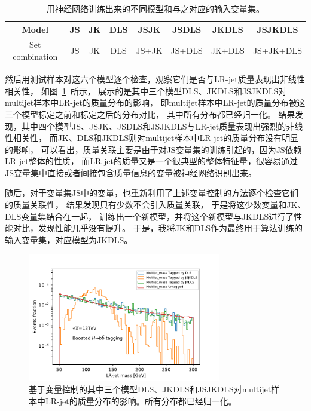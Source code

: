 \begin{table}[ht]
\caption{用神经网络训练出来的不同模型和与之对应的输入变量集。}
\begin{center}
\begin{adjustbox}{width=\columnwidth,center}
\begin{tabular}{c|c|c|c|c|c|c|c}
    \hline
    \hline
    Model & JS & JK & DLS & JSJK & JSDLS & JKDLS & JSJKDLS \\
    \hline  
    Set combination & JS & JK & DLS & JS+JK & JS+DLS & JK+DLS & JS+JK+DLS\\
    \hline
    \hline
\end{tabular}
\end{adjustbox}
\end{center}
\label{tab:MODELS}
\end{table}

然后用测试样本对这六个模型逐个检查，观察它们是否与LR-jet质量表现出非线性相关性，
如图~\ref{fig:XbbTagger1}~所示，
展示的是其中三个模型DLS、JKDLS和JSJKDLS对multijet样本中LR-jet的质量分布的影响，
即multijet样本中LR-jet的质量分布被这三个模型标定之前和标定之后的分布对比，
其中所有分布都已经归一化。
结果发现，其中四个模型JS、JSJK、JSDLS和JSJKDLS与LR-jet质量表现出强烈的非线性相关性，
而JK、DLS和JKDLS则对multijet样本中LR-jet的质量分布没有明显的影响，
可以看出，质量关联主要是由于对JS变量集的训练引起的，因为JS依赖LR-jet整体的性质，
而LR-jet的质量又是一个很典型的整体特征量，很容易通过JS变量集中直接或者间接包含质量信息的变量被神经网络识别出来。

随后，对于变量集JS中的变量，也重新利用了上述变量控制的方法逐个检查它们的质量关联性，
结果发现只有少数不会引入质量关联，
于是将这少数变量和JK、DLS变量集结合在一起，
训练出一个新模型，并将这个新模型与JKDLS进行了性能对比，发现性能几乎没有提升。
于是，我将JK和DLS作为最终用于算法训练的输入变量集，对应模型为JKDLS。


\begin{figure}
  \begin{center}
    \includegraphics[width=0.75\textwidth]{figuresXbb/XbbTagger1.pdf}
  \end{center}
  \caption{
基于变量控制的其中三个模型DLS、JKDLS和JSJKDLS对multijet样本中LR-jet的质量分布的影响。所有分布都已经归一化。
  }
    \label{fig:XbbTagger1}
\end{figure}



